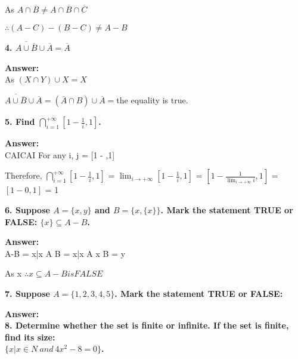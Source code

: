 \documentclass{article}
\begin{document}
\begin{large}
As $A \cap \overline{B} \neq A \cap \overline{B} \cap \overline{C}$

$\therefore (A-C)-(B-C) \neq A-B$

\textbf{4. $\overline{A\cup \overline{B}} \cup \overline{A}=\overline{A}$}

\textbf{Answer:} \\

As $(X \cap Y) \cup X = X$

$\overline{A\cup \overline{B}} \cup \overline{A} = (\overline{A} \cap B) \cup \overline{A}
                                                 = $$

$\therefore the equality is true.

\textbf{5. Find $\bigcap\limits_{i=1}^{+\infty}[1-\frac{1}{i}, 1]$.}

\textbf{Answer:} \\

             CAICAI
For any i, j \in [1, +\infty), i and j are integers and i < j
                         CAICAI
we know $1 - \frac{1}{i} \lessthan \frac{1}{j}$

we know [1 - \frac{1}{i}, 1] \cap [1 - \frac{1}{j},1] = [1 - ,1]

Therefore, $\bigcap\limits_{i=1}^{+\infty}[1-\frac{1}{i}, 1]$ = $\lim_{i\to + \infty} [1 - \frac{1}{i},1]$
                                                              = $[1 - \frac{1}{\lim_{i\to + \infty}i}, 1]$
                                                              = $[1 - 0, 1]$
                                                              = 1


\textbf{6. Suppose $A=\{x,y\}$ and $B=\{x,\{x\}\}$. Mark the statement TRUE or FALSE: $\{x\}\subseteq A-B$.}

\textbf{Answer:} \\

A-B = {x|x \in A \cap \overline B}
    = {x|x \in A \land x \notin B}
    = {y}

As {x} 
$\therefore {x} \subseteq A-B is FALSE$


\textbf{7. Suppose $A=\{1,2,3,4,5\}$. Mark the statement TRUE or FALSE:}

\textbf{Answer:} \\




\textbf{8. Determine whether the set is finite or infinite. If the set is finite, find its size:\\
\indent$\{x|x\in N\ and\ 4{x^{2}}-8=0\}$.}


\end{large}
\end{document}
